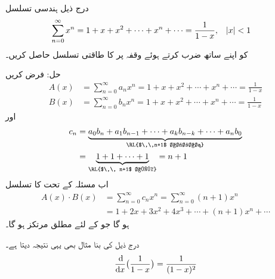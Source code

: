  درج ذیل ہندسی تسلسل
\begin{align*}
\sum_{n=0}^{\infty}x^n&=1+x+x^2+\cdots+x^n+\cdots=\frac{1}{1-x},&&\abs{x}<1
\end{align*}
کو اپنے ساتھ ضرب کرتے ہوئے وقفہ  پر  کا طاقتی تسلسل حاصل کریں۔

حل:\quad
فرض کریں
\begin{align*}
A(x)&=\sum_{n=0}^{\infty}a_nx^n=1+x+x^2+\cdots+x^n+\cdots=\frac{1}{1-x}\\
B(x)&=\sum_{n=0}^{\infty}b_nx^n=1+x+x^2+\cdots+x^n+\cdots=\frac{1}{1-x}
\end{align*}
اور
\begin{align*}
c_n&=\underbrace{a_0b_n+a_1b_{n-1}+\cdots+a_kb_{n-k}+\cdots+a_nb_0}_{\text{\RL{$\,\,n+1$ اجزاء}}}\\
&=\underbrace{1+1+\cdots+1}_{\text{\RL{$\,\, n+1$ ایک}}}=n+1
\end{align*}
اب مسئلہ  کے تحت  کا تسلسل
\begin{align*}
A(x)\cdot B(x)&=\sum_{n=0}^{\infty}c_nx^n=\sum_{n=0}^{\infty}(n+1)x^n\\
&=1+2x+3x^2+4x^3+\cdots+(n+1)x^n+\cdots
\end{align*}
ہو گا جو  کے لئے  مطلق مرتکز ہو گا۔

درج ذیل کی بنا مثال  بھی یہی نتیجہ دیتا ہے۔
\begin{align*}
\frac{\dif}{\dif x}\big(\frac{1}{1-x}\big)=\frac{1}{(1-x)^2}
\end{align*}
